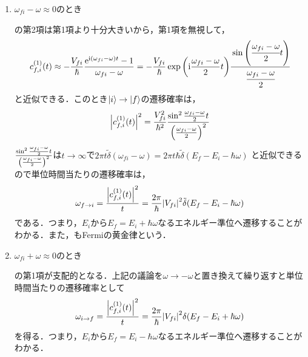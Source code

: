 \documentclass{report}
\begin{document}
  \begin{enumerate}
    \item $\omega_{fi} - \omega \approx 0$のとき\par
      の第2項は第1項より十分大きいから，第1項を無視して，
      \begin{align}
        c_{f, i}^{(1)}(t) \approx - \frac{V_{fi}}{\hbar}\frac{\mathrm{e}^{\mathrm{i}(\omega_{fi} - \omega)t} - 1}{\omega_{fi} - \omega} = -\frac{V_{fi}}{\hbar}\exp\qty(\mathrm{i}\frac{\omega_{fi} - \omega}{2}t)\cfrac{\sin\qty(\cfrac{\omega_{fi} - \omega}{2}t)}{\cfrac{\omega_{fi} - \omega}{2}}
      \end{align}
      と近似できる．このとき$\ket{i}\to\ket{f}$の遷移確率は，
      \begin{align}
        \abs{c_{f, i}^{(1)}(t)}^2 = \frac{V_{fi}^2}{\hbar^2}\frac{\sin^2\frac{\omega_{fi} - \omega}{2}t}{\qty(\frac{\omega_{fi} - \omega}{2})^2}
      \end{align}
      $\frac{\sin^2\frac{\omega_{fi}-\omega}{2}t}{\qty(\frac{\omega_{fi} - \omega}{2})^2}$は$t\to\infty$で$2\pi t\tilde{\delta}(\omega_{fi} - \omega) = 2\pi t\hbar\tilde{\delta}(E_f - E_i - \hbar\omega)$
      と近似できるので単位時間当たりの遷移確率は，
      \begin{align}
        \omega_{f\to i} = \frac{\abs{c_{f, i}^{(1)}(t)}^2}{t} = \frac{2\pi}{\hbar}\abs{V_{fi}}^2\tilde{\delta}(E_f - E_i - \hbar\omega)\label{harmonic-perturbation-fermi-rule}
      \end{align}
      である．つまり，$E_i$から$E_f = E_i + \hbar\omega$なるエネルギー準位へ遷移することがわかる．また，もFermiの黄金律という．
    \item $\omega_{fi} + \omega \approx 0$のとき\par
      の第1項が支配的となる．上記の議論を$\omega \to -\omega$と置き換えて繰り返すと単位時間当たりの遷移確率として
      \begin{align}
        \omega_{i\to f} = \frac{\abs{c_{f, i}^{(1)}(t)}^2}{t} = \frac{2\pi}{\hbar}\abs{V_{fi}}^2\delta(E_f - E_i + \hbar\omega)
      \end{align}
      を得る．つまり，$E_i$から$E_f = E_i - \hbar\omega$なるエネルギー準位へ遷移することがわかる．
  \end{enumerate}
\end{document}

